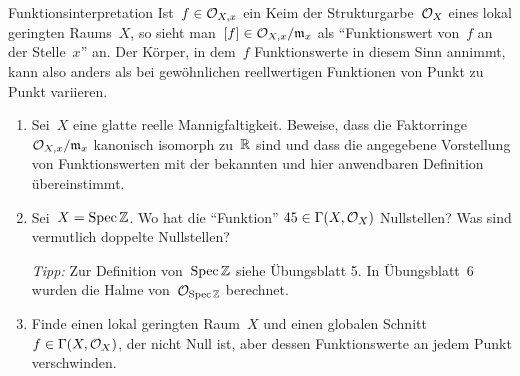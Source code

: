 \documentclass{uebblatt}
\begin{document}
\begin{aufgabe}{Funktionsinterpretation}
Ist~$f \in \mathcal{O}_{X,x}$ ein Keim der Strukturgarbe~$\mathcal{O}_X$ eines lokal geringten
Raums~$X$, so sieht man~$[f] \in \mathcal{O}_{X,x}/\mathfrak{m}_x$ als "`Funktionswert von~$f$ an
der Stelle~$x$"' an. Der Körper, in dem~$f$ Funktionswerte in diesem Sinn
annimmt, kann also anders als bei gewöhnlichen reellwertigen Funktionen von
Punkt zu Punkt variieren.
\begin{enumerate}
\item Sei~$X$ eine glatte reelle Mannigfaltigkeit. Beweise, dass die
Faktorringe~$\mathcal{O}_{X,x}/\mathfrak{m}_x$ kanonisch isomorph zu~$\mathbb{R}$ sind und dass die
angegebene Vorstellung von Funktionswerten mit der bekannten und hier
anwendbaren Definition übereinstimmt.
\item Sei~$X = \operatorname{Spec} \mathbb{Z}$. Wo hat die "`Funktion"' $45 \in \Gamma(X,\mathcal{O}_X)$
Nullstellen? Was sind vermutlich doppelte Nullstellen?

\emph{Tipp:} Zur Definition von~$\operatorname{Spec}\mathbb{Z}$ siehe Übungsblatt 5. In
Übungsblatt~6 wurden die Halme von~$\mathcal{O}_{\operatorname{Spec}\mathbb{Z}}$ berechnet.
\item Finde einen lokal geringten Raum~$X$ und einen globalen Schnitt~$f \in
\Gamma(X,\mathcal{O}_X)$, der nicht Null ist, aber dessen Funktionswerte an jedem Punkt
verschwinden.
\end{enumerate}
\end{aufgabe}
\end{document}
